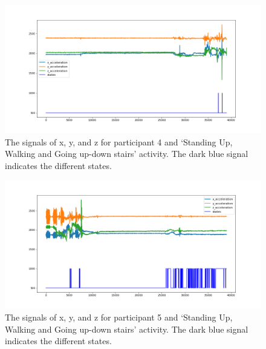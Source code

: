 \begin{figure}[H]
    \centering
    \begin{minipage}[b]{1\textwidth}
        \includegraphics[width=\textwidth]{manuscript/src/figures/Ass3/Ass3_Q2_states_user_3.png}
    \end{minipage}
    \caption{The signals of x, y, and z for participant 4 and ‘Standing  Up,  Walking  and  Going  up-down  stairs’ activity. The dark blue signal indicates the different states.}
    \label{fig:Ass3_Q2_states_user_3}
\end{figure}
\begin{figure}[H]
    \centering
    \begin{minipage}[b]{1\textwidth}
        \includegraphics[width=\textwidth]{manuscript/src/figures/Ass3/Ass3_Q2_states_user_4.png}
    \end{minipage}
    \caption{The signals of x, y, and z for participant 5 and ‘Standing  Up,  Walking  and  Going  up-down  stairs’ activity. The dark blue signal indicates the different states.}
    \label{fig:Ass3_Q2_states_user_4}
\end{figure}
